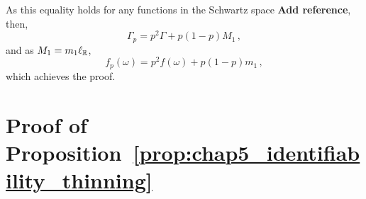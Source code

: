 \begin{subappendices}
        As this equality holds for any functions in the Schwartz space \textbf{Add reference}, then,
        \[\Gamma_p = p^2 \Gamma + p(1-p) M_1\,,\]
        and as $M_1 = m_1 \ell_{{\mathbb R}}$,
        \[f_p(\omega) = p^2 f(\omega) + p(1-p) m_1\,,\]
        which achieves the proof.



    \section{Proof of Proposition~\ref{prop:chap5_identifiability_thinning}}\label{appendix:chap5_proof_identifiability_thinning}
        
\end{subappendices}